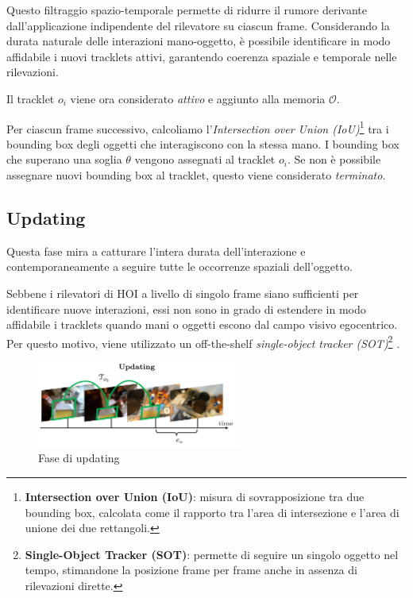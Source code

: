 Questo filtraggio spazio-temporale permette di ridurre il rumore derivante dall’applicazione indipendente del rilevatore su ciascun frame. Considerando la durata naturale delle interazioni mano-oggetto, è possibile identificare in modo affidabile i nuovi tracklets attivi, garantendo coerenza spaziale e temporale nelle rilevazioni.  

Il tracklet $o_i$ viene ora considerato \emph{attivo} e aggiunto alla memoria $\mathcal{O}$.  

Per ciascun frame successivo, calcoliamo l’\emph{Intersection over Union (IoU)}\footnote{\textbf{Intersection over Union (IoU)}: misura di sovrapposizione tra due bounding box, calcolata come il rapporto tra l'area di intersezione e l'area di unione dei due rettangoli.} tra i bounding box degli oggetti che interagiscono con la stessa mano. I bounding box che superano una soglia $\theta$ vengono assegnati al tracklet $o_i$. Se non è possibile assegnare nuovi bounding box al tracklet, questo viene considerato \emph{terminato}.

\subsection*{Updating}

Questa fase mira a catturare l’intera durata dell’interazione e contemporaneamente a seguire tutte le occorrenze spaziali dell’oggetto.

Sebbene i rilevatori di HOI a livello di singolo frame siano sufficienti per identificare nuove interazioni, essi non sono in grado di estendere in modo affidabile i tracklets quando mani o oggetti escono dal campo visivo egocentrico. Per questo motivo, viene utilizzato un off-the-shelf \emph{single-object tracker (SOT)}\footnote{\textbf{Single-Object Tracker (SOT)}: permette di seguire un singolo oggetto nel tempo, stimandone la posizione frame per frame anche in assenza di rilevazioni dirette.} \cite{tang2023egotrackslongtermegocentricvisual}.  

\begin{figure}[ht]
    \centering
    \includegraphics[width=0.6\textwidth]{Images/update.png}
    \caption{Fase di updating}
    \label{fig:update}
\end{figure}

